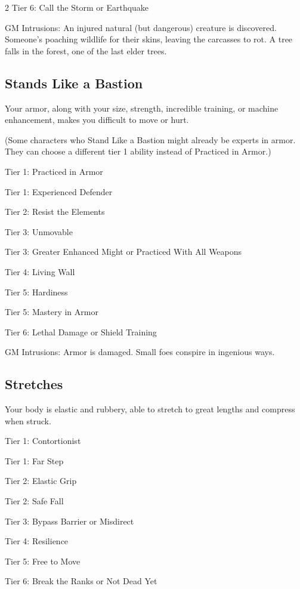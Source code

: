 \begin{multicols}{2}
Tier 6: Call the Storm or Earthquake

GM Intrusions: An injured natural (but dangerous) creature is discovered. Someone’s poaching wildlife for their skins, leaving the carcasses to rot. A tree falls in the forest, one of the last elder trees.

\subsection{Stands Like a Bastion}

Your armor, along with your size, strength, incredible training, or machine enhancement, makes you difficult to move or hurt.

(Some characters who Stand Like a Bastion might already be experts in armor. They can choose a different tier 1 ability instead of Practiced in Armor.)

Tier 1: Practiced in Armor

Tier 1: Experienced Defender

Tier 2: Resist the Elements

Tier 3: Unmovable

Tier 3: Greater Enhanced Might or Practiced With All Weapons

Tier 4: Living Wall

Tier 5: Hardiness

Tier 5: Mastery in Armor

Tier 6: Lethal Damage or Shield Training

GM Intrusions: Armor is damaged. Small foes conspire in ingenious ways.

\subsection{Stretches}

Your body is elastic and rubbery, able to stretch to great lengths and compress when struck.

Tier 1: Contortionist

Tier 1: Far Step

Tier 2: Elastic Grip

Tier 2: Safe Fall

Tier 3: Bypass Barrier or Misdirect 

Tier 4: Resilience 

Tier 5: Free to Move 

Tier 6: Break the Ranks or Not Dead Yet


\end{multicols}
